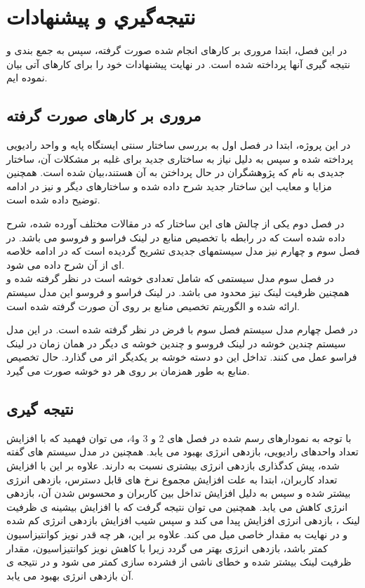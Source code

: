 \chapter{ نتيجه‌گيري و پیشنهادات}
در این فصل، ابتدا مروری بر کارهای انجام شده صورت گرفته، سپس به جمع بندی و نتیجه گیری آنها پرداخته شده است. در نهایت پیشنهادات خود را برای کارهای آتی بیان نموده ایم.
\section{مروری بر کارهای صورت گرفته}
در این پروژه، ابتدا در فصل اول به بررسی ساختار سنتی ایستگاه پایه و واحد رادیویی پرداخته شده و سپس به دلیل نیاز به ساختاری جدید برای غلبه بر مشکلات آن، ساختار جدیدی به نام  که پژوهشگران در حال پرداختن به آن هستند،بیان شده است. همچنین مزایا و معایب این ساختار جدید شرح داده شده و ساختارهای دیگر  و  نیز در ادامه توضیح داده شده است. 

در فصل دوم یکی از چالش های این ساختار که در مقالات مختلف آورده شده، شرح داده شده است که در رابطه با تخصیص منابع در لینک فراسو و فروسو می باشد. در فصل سوم و چهارم نیز مدل سیستمهای جدیدی تشریح گردیده است که در ادامه خلاصه ای از آن شرح داده می شود. \\
در فصل سوم مدل سیستمی که شامل تعدادی خوشه است در نظر گرفته شده و همچنین ظرفیت لینک  نیز محدود می باشد. در لینک فراسو و فروسو این مدل سیستم ارائه شده و  الگوریتم تخصیص منابع بر روی آن صورت گرفته شده است. 

در فصل چهارم مدل سیستم فصل سوم با فرض  در نظر گرفته شده است. در این مدل سیستم چندین خوشه در لینک فروسو و چندین خوشه ی دیگر در همان زمان در لینک فراسو عمل می کنند. تداخل این دو دسته خوشه بر یکدیگر اثر می گذارد. حال تخصیص منابع به طور همزمان بر روی هر دو خوشه صورت می گیرد.
\section{نتیجه گیری}
با توجه به نمودارهای رسم شده در فصل های 2 و 3 و4، می توان فهمید که با افزایش تعداد واحدهای رادیویی، بازدهی انرژی بهبود می یابد. همچنین در مدل سیستم های گفته شده، پیش کدگذاری 
 بازدهی انرژی بیشتری نسبت به 
 دارند.
علاوه بر این با افزایش تعداد کاربران، ابتدا به علت افزایش مجموع نرخ های قابل دسترس، بازدهی انرژی بیشتر شده و سپس به دلیل افزایش تداخل بین کاربران و محسوس شدن آن، بازدهی انرژی کاهش می یابد. 
همچنین می توان نتیجه گرفت که با افزایش بیشینه ی ظرفیت لینک ، بازدهی انرژی افزایش پیدا می کند و سپس شیب افزایش بازدهی انرژی کم شده و در نهایت به مقدار خاصی میل می کند.
علاوه بر این، هر چه قدر نویز کوانتیزاسیون کمتر باشد، بازدهی انرژی بهتر می گردد زیرا با کاهش نویز کوانتیزاسیون، مقدار ظرفیت لینک  بیشتر شده و خطای ناشی از فشرده سازی کمتر می شود و در نتیجه ی آن بازدهی انرژی بهبود می یابد.
